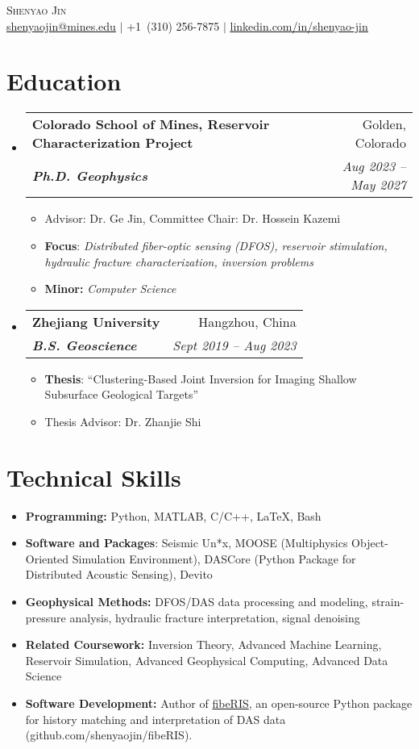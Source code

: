 \documentclass[letterpaper,13pt]{article}
\makeatletter
\newcommand{\resumeItem}[1]{\item\small{{#1 \vspace{-2pt}}}}
\newcommand{\resumeSubheading}[4]{
  \vspace{-2pt}\item
    \begin{tabular*}{0.97\textwidth}[t]{l@{\extracolsep{\fill}}r}
      \textbf{#1} & #2 \\
      \textit{\small#3} & \textit{\small #4} \\
    \end{tabular*}\vspace{-7pt}
}
\newcommand{\resumeItemListStart}{\begin{itemize}[label={\small$\bullet$}]}
\newcommand{\resumeItemListEnd}{\end{itemize}\vspace{-5pt}}
\newcommand{\resumeSubHeadingListStart}{\begin{itemize}[leftmargin=0.15in, label={}]}
\newcommand{\resumeSubHeadingListEnd}{\end{itemize}}
\makeatother
\begin{document}
\begin{center}
    {\Huge \scshape Shenyao Jin} \\ \vspace{1pt}
    \small \underline{shenyaojin@mines.edu} $|$ {+1\ (310) 256-7875} $|$ \href{https://www.linkedin.com/in/shenyao-jin/}{\underline{linkedin.com/in/shenyao-jin}} \\
\end{center}

\section{Education}
\resumeSubHeadingListStart

\resumeSubheading
  {Colorado School of Mines, Reservoir Characterization Project}{Golden, Colorado}
  {\textbf{Ph.D. Geophysics}}{Aug 2023 -- May 2027}
  \resumeItemListStart
    \resumeItem{Advisor: Dr. Ge Jin, Committee Chair: Dr. Hossein Kazemi}
    \resumeItem{\textbf{Focus}: \textit{Distributed fiber-optic sensing (DFOS), reservoir stimulation, hydraulic fracture characterization, inversion problems}}
    \resumeItem{\textbf{Minor:} \textit{Computer Science}}
  \resumeItemListEnd

\resumeSubheading
  {Zhejiang University}{Hangzhou, China}
  {\textbf{B.S. Geoscience}}{Sept 2019 -- Aug 2023}
  \resumeItemListStart
    \resumeItem{\textbf{Thesis}: ``Clustering-Based Joint Inversion for Imaging Shallow Subsurface Geological Targets''}
    \resumeItem{Thesis Advisor: Dr. Zhanjie Shi}
  \resumeItemListEnd

\resumeSubHeadingListEnd

\section{Technical Skills}
\resumeItemListStart
\resumeItem{
  \textbf{Programming:} Python, MATLAB, C/C++, \LaTeX, Bash
}
\resumeItem{
  \textbf{Software and Packages}: Seismic Un*x, MOOSE (Multiphysics Object-Oriented Simulation Environment), DASCore (Python Package for Distributed Acoustic Sensing), Devito
}
\resumeItem{
  \textbf{Geophysical Methods:} DFOS/DAS data processing and modeling, strain-pressure analysis, hydraulic fracture interpretation, signal denoising
}
\resumeItem{
  \textbf{Related Coursework:} Inversion Theory, Advanced Machine Learning, Reservoir Simulation, Advanced Geophysical Computing, Advanced Data Science
}
\resumeItem{\textbf{Software Development:} Author of \href{https://github.com/shenyaojin/fibeRIS}{fibeRIS}, an open-source Python package for history matching and interpretation of DAS data (github.com/shenyaojin/fibeRIS).}
\resumeItemListEnd
\end{document}
